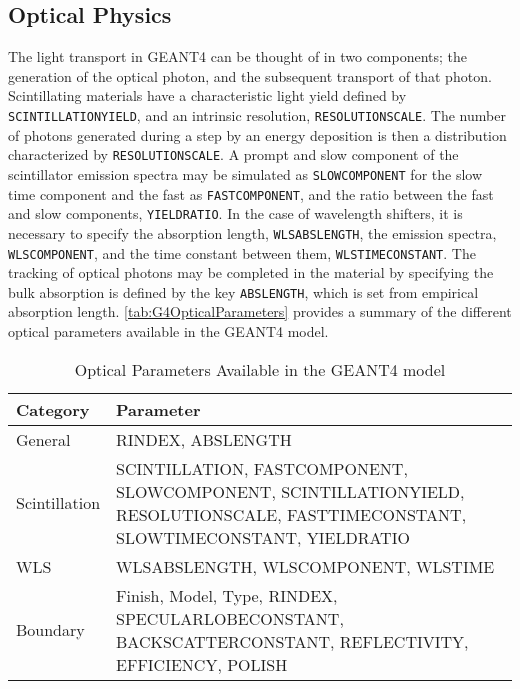 \subsection{Optical Physics}
The light transport in GEANT4 can be thought of in two components; the generation of the optical photon, and the subsequent transport of that photon.
Scintillating materials have a characteristic light yield defined by \verb+SCINTILLATIONYIELD+, and an intrinsic resolution, \verb+RESOLUTIONSCALE+.
The number of photons generated during a step by an energy deposition is then a distribution characterized by \verb+RESOLUTIONSCALE+.
A prompt and slow component of the scintillator emission spectra may be simulated as \verb+SLOWCOMPONENT+ for the slow time component and the fast as \verb+FASTCOMPONENT+, and the ratio between the fast and slow components, \verb+YIELDRATIO+.
In the case of wavelength shifters, it is necessary to specify the absorption length, \verb+WLSABSLENGTH+, the emission spectra, \verb+WLSCOMPONENT+, and the time constant between them, \verb+WLSTIMECONSTANT+.
The tracking of optical photons may be completed in the material by specifying the bulk absorption is defined by the key \verb+ABSLENGTH+, which is set from empirical absorption length.
\autoref{tab:G4OpticalParameters} provides a summary of the different optical parameters available in the GEANT4 model.
\begin{table}
	\caption[Optical Parameters Available in GEANT4]{Optical Parameters Available in the GEANT4 model}
	\label{tab:G4OpticalParameters}
	\begin{tabular}{p{2cm} | p{10cm}}
	\toprule
	Category & Parameter \\
	\midrule
	General & RINDEX, ABSLENGTH \\
	Scintillation & SCINTILLATION, FASTCOMPONENT, SLOWCOMPONENT, SCINTILLATIONYIELD, RESOLUTIONSCALE, FASTTIMECONSTANT, SLOWTIMECONSTANT, YIELDRATIO \\
	WLS & WLSABSLENGTH, WLSCOMPONENT, WLSTIME \\
	Boundary & Finish, Model, Type, RINDEX, SPECULARLOBECONSTANT, BACKSCATTERCONSTANT, REFLECTIVITY, EFFICIENCY, POLISH \\
	\bottomrule	
	\end{tabular}
\end{table}

